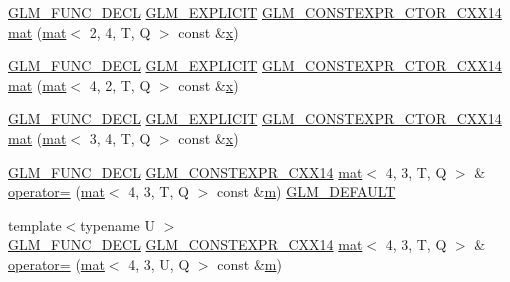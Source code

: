 \begin{DoxyCompactItemize}
\item 
\hyperlink{setup_8hpp_ab2d052de21a70539923e9bcbf6e83a51}{G\+L\+M\+\_\+\+F\+U\+N\+C\+\_\+\+D\+E\+CL} \hyperlink{setup_8hpp_a6c74f5a5e7b134ab69023ff9a30d4d5d}{G\+L\+M\+\_\+\+E\+X\+P\+L\+I\+C\+IT} \hyperlink{setup_8hpp_a0900f9145e68bf6061b6f5e7be3fa751}{G\+L\+M\+\_\+\+C\+O\+N\+S\+T\+E\+X\+P\+R\+\_\+\+C\+T\+O\+R\+\_\+\+C\+X\+X14} \hyperlink{structglm_1_1mat_3_014_00_013_00_01_t_00_01_q_01_4_a47003b7eb7d2f552dc92695a720231a6}{mat} (\hyperlink{structglm_1_1mat}{mat}$<$ 2, 4, T, Q $>$ const \&\hyperlink{_s_d_l__opengl_8h_ad0e63d0edcdbd3d79554076bf309fd47}{x})
\item 
\hyperlink{setup_8hpp_ab2d052de21a70539923e9bcbf6e83a51}{G\+L\+M\+\_\+\+F\+U\+N\+C\+\_\+\+D\+E\+CL} \hyperlink{setup_8hpp_a6c74f5a5e7b134ab69023ff9a30d4d5d}{G\+L\+M\+\_\+\+E\+X\+P\+L\+I\+C\+IT} \hyperlink{setup_8hpp_a0900f9145e68bf6061b6f5e7be3fa751}{G\+L\+M\+\_\+\+C\+O\+N\+S\+T\+E\+X\+P\+R\+\_\+\+C\+T\+O\+R\+\_\+\+C\+X\+X14} \hyperlink{structglm_1_1mat_3_014_00_013_00_01_t_00_01_q_01_4_a90a71c099a6a8f4877981c0929885cc9}{mat} (\hyperlink{structglm_1_1mat}{mat}$<$ 4, 2, T, Q $>$ const \&\hyperlink{_s_d_l__opengl_8h_ad0e63d0edcdbd3d79554076bf309fd47}{x})
\item 
\hyperlink{setup_8hpp_ab2d052de21a70539923e9bcbf6e83a51}{G\+L\+M\+\_\+\+F\+U\+N\+C\+\_\+\+D\+E\+CL} \hyperlink{setup_8hpp_a6c74f5a5e7b134ab69023ff9a30d4d5d}{G\+L\+M\+\_\+\+E\+X\+P\+L\+I\+C\+IT} \hyperlink{setup_8hpp_a0900f9145e68bf6061b6f5e7be3fa751}{G\+L\+M\+\_\+\+C\+O\+N\+S\+T\+E\+X\+P\+R\+\_\+\+C\+T\+O\+R\+\_\+\+C\+X\+X14} \hyperlink{structglm_1_1mat_3_014_00_013_00_01_t_00_01_q_01_4_ab02b98c535e2feba4fee9c5ad22e6776}{mat} (\hyperlink{structglm_1_1mat}{mat}$<$ 3, 4, T, Q $>$ const \&\hyperlink{_s_d_l__opengl_8h_ad0e63d0edcdbd3d79554076bf309fd47}{x})
\item 
\hyperlink{setup_8hpp_ab2d052de21a70539923e9bcbf6e83a51}{G\+L\+M\+\_\+\+F\+U\+N\+C\+\_\+\+D\+E\+CL} \hyperlink{setup_8hpp_a4dd12abf5e1164bc57f3a34671d03844}{G\+L\+M\+\_\+\+C\+O\+N\+S\+T\+E\+X\+P\+R\+\_\+\+C\+X\+X14} \hyperlink{structglm_1_1mat}{mat}$<$ 4, 3, T, Q $>$ \& \hyperlink{structglm_1_1mat_3_014_00_013_00_01_t_00_01_q_01_4_aaf2a374e657fd2ce2b18694af6d9cfd5}{operator=} (\hyperlink{structglm_1_1mat}{mat}$<$ 4, 3, T, Q $>$ const \&\hyperlink{_s_d_l__opengl__glext_8h_af593500c283bf1a787a6f947f503a5c2}{m}) \hyperlink{setup_8hpp_aefce7051c376a64ba89fa93a9f63bc2c}{G\+L\+M\+\_\+\+D\+E\+F\+A\+U\+LT}
\item 
{\footnotesize template$<$typename U $>$ }\\\hyperlink{setup_8hpp_ab2d052de21a70539923e9bcbf6e83a51}{G\+L\+M\+\_\+\+F\+U\+N\+C\+\_\+\+D\+E\+CL} \hyperlink{setup_8hpp_a4dd12abf5e1164bc57f3a34671d03844}{G\+L\+M\+\_\+\+C\+O\+N\+S\+T\+E\+X\+P\+R\+\_\+\+C\+X\+X14} \hyperlink{structglm_1_1mat}{mat}$<$ 4, 3, T, Q $>$ \& \hyperlink{structglm_1_1mat_3_014_00_013_00_01_t_00_01_q_01_4_a82d2202eb9fed8f650e228affae47ba7}{operator=} (\hyperlink{structglm_1_1mat}{mat}$<$ 4, 3, U, Q $>$ const \&\hyperlink{_s_d_l__opengl__glext_8h_af593500c283bf1a787a6f947f503a5c2}{m})

\end{DoxyCompactItemize}
